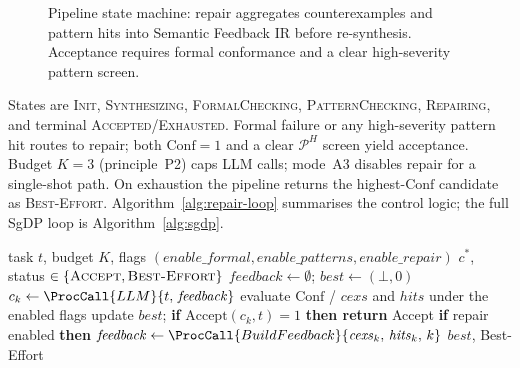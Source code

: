 \begin{figure}[t]
  \centering
  \caption{Pipeline state machine: repair aggregates counterexamples and
           pattern hits into Semantic Feedback IR before re-synthesis.
           Acceptance requires formal conformance and a clear high-severity
           pattern screen.}
  \label{fig:pipeline-state}
\end{figure}

States are \textsc{Init}, \textsc{Synthesizing}, \textsc{FormalChecking},
\textsc{PatternChecking}, \textsc{Repairing}, and terminal
\textsc{Accepted}/\textsc{Exhausted}.
Formal failure or any high-severity pattern hit routes to repair; both
$\mathrm{Conf}=1$ and a clear $\mathcal{P}^H$ screen yield acceptance.
Budget $K{=}3$ (principle~P2) caps LLM calls; mode~A3 disables repair for a
single-shot path.
On exhaustion the pipeline returns the highest-$\mathrm{Conf}$ candidate as
\textsc{Best-Effort}.
Algorithm~\ref{alg:repair-loop} summarises the control logic; the full SgDP
loop is Algorithm~\ref{alg:sgdp}.

\begin{algorithm}[t]
\caption{Counterexample-Guided Repair Loop (sketch)}
\label{alg:repair-loop}
\begin{algorithmic}[1]
\Require task $t$, budget $K$, flags
         $(\mathit{enable\_formal}, \mathit{enable\_patterns}, \mathit{enable\_repair})$
\Ensure $c^*$, status $\in \{\textsc{Accept}, \textsc{Best-Effort}\}$
\State $\mathit{feedback} \leftarrow \emptyset$;\quad
       $\mathit{best} \leftarrow (\bot, 0)$
  \State $c_k \leftarrow \ProcCall{LLM}{t,\, \mathit{feedback}}$
  \State evaluate $\mathrm{Conf}$ / $\mathit{cexs}$ and $\mathit{hits}$
        under the enabled flags
  \State update $\mathit{best}$; \textbf{if}
        $\mathrm{Accept}(c_k,t)=1$ \textbf{then return} Accept
  \State \textbf{if} repair enabled \textbf{then}
        $\mathit{feedback} \leftarrow
        \ProcCall{BuildFeedback}{\mathit{cexs}_k,\, \mathit{hits}_k,\, k}$
\EndFor
\State \Return $\mathit{best}$, Best-Effort
\end{algorithmic}
\end{algorithm}

